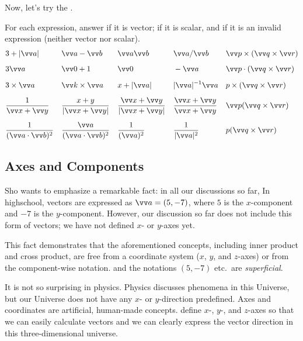 \documentclass[11pt,pdfa,lastpage]{MishoNote}
\begin{document}
Now, let's try the .
\begin{problems}
\Problem[S] For each expression, answer  if it is vector;  if it is scalar, and  if it is an invalid expression (neither vector nor scalar).
\begin{align*}
  & 3+|\vc a|
  && \vc a-\vc b
  && \vc a\vc b
  && \vc a/\vc b
  && \vc p\times(\vc q\times\vc r)
\\[.5em]& 3\vc a
  && \vc 0+1
  && \vc 0
  && -\vc a
  && \vc p\cdot(\vc q\times\vc r)
\\[.5em]& 3\times\vc a
  && \vc k\times\vc a
  && x+|\vc a|
  && |\vc a|^{-1}\vc a
  && p\times(\vc q\times\vc r)
\\[.5em]& \frac{1}{\vc x+\vc y}
  && \frac{x+y}{|\vc x+\vc y|}
  && \frac{\vc x+\vc y}{|\vc x+\vc y|}
  && \frac{\vc x+\vc y}{\vc x+\vc y}
  && \vc p(\vc q\times\vc r)
\\[.5em]& \frac{1}{(\vc a\cdot\vc b)^2}
  && \frac{\vc a}{(\vc a\cdot\vc b)^2}
  && \frac{1}{(\vc a)^2}
  && \frac{1}{|\vc a|^2}
  && p(\vc q\times\vc r)
\end{align*}
\end{problems}

\newpage
\subsection{Axes and Components}\label{sec:component}
Sho wants to emphasize a remarkable fact: in all our discussions so far,  In highschool, vectors are expressed as $\vc a=(5,-7)$, where $5$ is the $x$-component and $-7$ is the $y$-component. However, our discussion so far does not include this form of vectors; we have not defined $x$- or $y$-axes yet.

This fact demonstrates that the aforementioned concepts, including inner product and cross product, are free from a coordinate system ($x$, $y$, and $z$-axes) or from the component-wise notation.  and the notations $(5,-7)$ etc.\ are \emph{superficial}.

It is not so surprising in physics. Physics discusses phenomena in this Universe, but our Universe does not have any $x$- or $y$-direction predefined. Axes and coordinates are artificial, human-made concepts.  define $x$-, $y$-, and $z$-axes so that we can easily calculate vectors and we can clearly express the vector direction in this three-dimensional universe.
\end{document}
